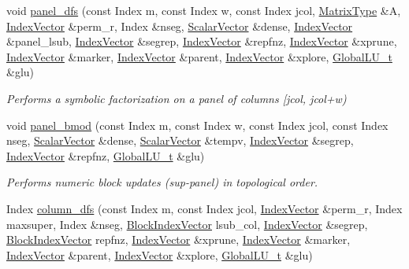 \begin{DoxyCompactItemize}
\item 
void \mbox{\hyperlink{class_eigen_1_1internal_1_1_sparse_l_u_impl_acaf62fda387ea03e9caa2734e4e7b0c9}{panel\+\_\+dfs}} (const Index m, const Index w, const Index jcol, \mbox{\hyperlink{class_eigen_1_1_sparse_matrix}{Matrix\+Type}} \&A, \mbox{\hyperlink{class_eigen_1_1_matrix}{Index\+Vector}} \&perm\+\_\+r, Index \&nseg, \mbox{\hyperlink{class_eigen_1_1_matrix}{Scalar\+Vector}} \&dense, \mbox{\hyperlink{class_eigen_1_1_matrix}{Index\+Vector}} \&panel\+\_\+lsub, \mbox{\hyperlink{class_eigen_1_1_matrix}{Index\+Vector}} \&segrep, \mbox{\hyperlink{class_eigen_1_1_matrix}{Index\+Vector}} \&repfnz, \mbox{\hyperlink{class_eigen_1_1_matrix}{Index\+Vector}} \&xprune, \mbox{\hyperlink{class_eigen_1_1_matrix}{Index\+Vector}} \&marker, \mbox{\hyperlink{class_eigen_1_1_matrix}{Index\+Vector}} \&parent, \mbox{\hyperlink{class_eigen_1_1_matrix}{Index\+Vector}} \&xplore, \mbox{\hyperlink{struct_eigen_1_1internal_1_1_l_u___global_l_u__t}{Global\+L\+U\+\_\+t}} \&glu)
\begin{DoxyCompactList}\small\item\em Performs a symbolic factorization on a panel of columns \mbox{[}jcol, jcol+w) \end{DoxyCompactList}\item 
void \mbox{\hyperlink{class_eigen_1_1internal_1_1_sparse_l_u_impl_a277936738db49e25285164ac25c498c3}{panel\+\_\+bmod}} (const Index m, const Index w, const Index jcol, const Index nseg, \mbox{\hyperlink{class_eigen_1_1_matrix}{Scalar\+Vector}} \&dense, \mbox{\hyperlink{class_eigen_1_1_matrix}{Scalar\+Vector}} \&tempv, \mbox{\hyperlink{class_eigen_1_1_matrix}{Index\+Vector}} \&segrep, \mbox{\hyperlink{class_eigen_1_1_matrix}{Index\+Vector}} \&repfnz, \mbox{\hyperlink{struct_eigen_1_1internal_1_1_l_u___global_l_u__t}{Global\+L\+U\+\_\+t}} \&glu)
\begin{DoxyCompactList}\small\item\em Performs numeric block updates (sup-\/panel) in topological order. \end{DoxyCompactList}\item 
Index \mbox{\hyperlink{class_eigen_1_1internal_1_1_sparse_l_u_impl_a6f543ae02eb6467e9bcc1e5cec8ccdd2}{column\+\_\+dfs}} (const Index m, const Index jcol, \mbox{\hyperlink{class_eigen_1_1_matrix}{Index\+Vector}} \&perm\+\_\+r, Index maxsuper, Index \&nseg, \mbox{\hyperlink{class_eigen_1_1_ref}{Block\+Index\+Vector}} lsub\+\_\+col, \mbox{\hyperlink{class_eigen_1_1_matrix}{Index\+Vector}} \&segrep, \mbox{\hyperlink{class_eigen_1_1_ref}{Block\+Index\+Vector}} repfnz, \mbox{\hyperlink{class_eigen_1_1_matrix}{Index\+Vector}} \&xprune, \mbox{\hyperlink{class_eigen_1_1_matrix}{Index\+Vector}} \&marker, \mbox{\hyperlink{class_eigen_1_1_matrix}{Index\+Vector}} \&parent, \mbox{\hyperlink{class_eigen_1_1_matrix}{Index\+Vector}} \&xplore, \mbox{\hyperlink{struct_eigen_1_1internal_1_1_l_u___global_l_u__t}{Global\+L\+U\+\_\+t}} \&glu)

\end{DoxyCompactItemize}
